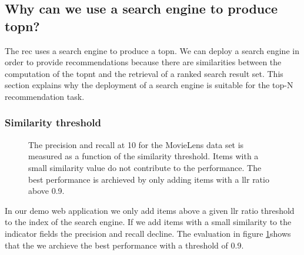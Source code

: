 \subsection{Why can we use a search engine to produce \gls{topn}?}
\label{sec:relation}

The \gls{rec} uses a search engine to produce a \gls{topn}. We can deploy a search engine in order to provide recommendations because there are similarities between the computation of the \gls{topnt} and the retrieval of a ranked search result set.
 This section explains why the deployment of a search engine is suitable for the top-N recommendation task.




\subsubsection{Similarity threshold}
\begin{figure}
  \centering
{}
\caption{The precision and recall at 10 for the MovieLens data set is measured as a function of the similarity threshold. Items with a small similarity value do not contribute to the performance. The best performance is archieved by only adding items with a \gls{llr} ratio above 0.9.}
\label{fig:threshold}
\end{figure}


In our demo web application we only add items above a given \gls{llr} ratio threshold to the index of the search engine. If we add items with a small similarity to the indicator fields the precision and recall decline. The evaluation in figure \ref{fig:threshold}shows that the we archieve the best performance with a threshold of 0.9.
